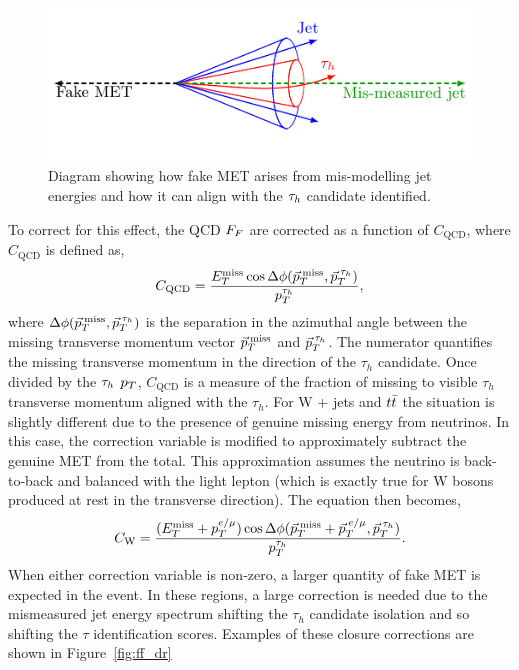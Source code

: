 \begin{figure}[!hbtp]
\centering
   \includegraphics[width=\textwidth]{Figures/fakemet_plot.pdf}
\caption[Diagram of the fake MET alignment with the $\tauh$ candidate.]{Diagram showing how fake MET arises from mis-modelling jet energies and how it can align with the $\tauh$ candidate identified.}
\label{fig:fakemet}
\end{figure}

To correct for this effect, the QCD $F_{F}$ are corrected as a function of $C_{\text{QCD}}$, where $C_{\text{QCD}}$ is defined as,
\begin{equation}
C_{\text{QCD}} = \frac{E_{T}^{\text{miss}} \cos\Delta\phi(\vec{p}_{T}^{\text{\hspace{2pt}miss}},\vec{p}_{T}^{\hspace{2pt}\tau_{h}})}{p_{T}^{\tau_{h}}},
\label{eqn:c_qcd}
\end{equation}
where $\Delta\phi(\vec{p}_{T}^{\hspace{2pt}\text{miss}},\vec{p}_{T}^{\hspace{2pt}\tau_{h}})$ is the separation in the azimuthal angle between the missing transverse momentum vector $\vec{p}_{T}^{\hspace{2pt}\text{miss}}$ and $\vec{p}_{T}^{\hspace{2pt}\tau_{h}}$.
The numerator quantifies the missing transverse momentum in the direction of the $\tau_h$ candidate. 
Once divided by the $\tauh$ $p_{T}$, $C_{\text{QCD}}$ is a measure of the fraction of missing to visible $\tau_h$ transverse momentum aligned with the $\tau_h$.
For W + jets and $t\bar{t}$ the situation is slightly different due to the presence of genuine missing energy from neutrinos.
In this case, the correction variable is modified to approximately subtract the genuine \ac{MET} from the total.
This approximation assumes the neutrino is back-to-back and balanced with the light lepton (which is exactly true for W bosons produced at rest in the transverse direction). 
The equation then becomes,
\begin{equation}
C_{\text{W}} = \frac{(E_{T}^{\text{miss}}+p_{T}^{e/\mu}) \cos\Delta\phi(\vec{p}_{T}^{\text{\hspace{2pt}miss}}+\vec{p}_{T}^{\hspace{2pt}e/\mu},\vec{p}_{T}^{\hspace{2pt}\tau_{h}})}{p_{T}^{\tau_{h}}}.
\label{eqn:c_w}
\end{equation}
When either correction variable is non-zero, a larger quantity of fake \ac{MET} is expected in the event. 
In these regions, a large correction is needed due to the mismeasured jet energy spectrum shifting the $\tau_h$ candidate isolation and so shifting the $\tau$ identification scores. 
Examples of these closure corrections are shown in Figure~\ref{fig:ff_dr}\\

